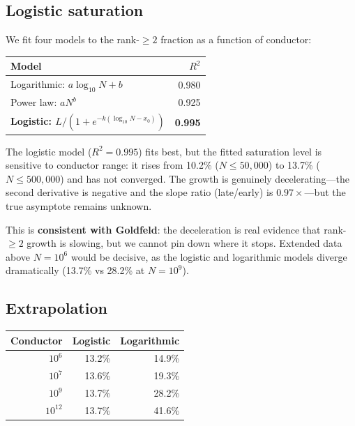 \documentclass[11pt,a4paper]{article}
\begin{document}
\subsection{Logistic saturation}

We fit four models to the rank-${\geq}2$ fraction as a function of conductor:

\begin{center}
\begin{tabular}{lr}
\toprule
\textbf{Model} & \textbf{$R^2$} \\
\midrule
Logarithmic: $a \log_{10} N + b$ & 0.980 \\
Power law: $a N^b$ & 0.925 \\
\textbf{Logistic: $L / (1 + e^{-k(\log_{10} N - x_0)})$} & \textbf{0.995} \\
\bottomrule
\end{tabular}
\end{center}

The logistic model ($R^2 = 0.995$) fits best, but the fitted saturation level is sensitive to conductor range: it rises from 10.2\% ($N \leq 50{,}000$) to 13.7\% ($N \leq 500{,}000$) and has not converged. The growth is genuinely decelerating---the second derivative is negative and the slope ratio (late/early) is $0.97\times$---but the true asymptote remains unknown.

This is \textbf{consistent with Goldfeld}: the deceleration is real evidence that rank-${\geq}2$ growth is slowing, but we cannot pin down where it stops. Extended data above $N = 10^6$ would be decisive, as the logistic and logarithmic models diverge dramatically (13.7\% vs 28.2\% at $N = 10^9$).

\subsection{Extrapolation}

\begin{center}
\begin{tabular}{rrr}
\toprule
\textbf{Conductor} & \textbf{Logistic} & \textbf{Logarithmic} \\
\midrule
$10^6$ & 13.2\% & 14.9\% \\
$10^7$ & 13.6\% & 19.3\% \\
$10^9$ & 13.7\% & 28.2\% \\
$10^{12}$ & 13.7\% & 41.6\% \\
\bottomrule
\end{tabular}
\end{center}
\end{document}
